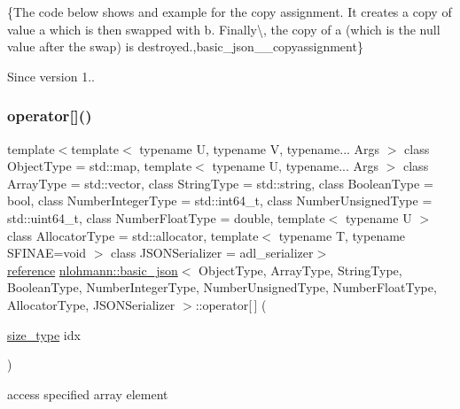 \{The code below shows and example for the copy assignment. It creates a copy of value {\ttfamily a} which is then swapped with {\ttfamily b}. Finally\textbackslash{}, the copy of {\ttfamily a} (which is the null value after the swap) is destroyed.,basic\+\_\+json\+\_\+\+\_\+copyassignment\}

\begin{DoxySince}{Since}
version 1.. 
\end{DoxySince}
\mbox{\label{classnlohmann_1_1basic__json_ac871e3b03fb2eeca9a8de4db2bea760f}} 
\subsubsection{\texorpdfstring{operator[]()}{operator[]()}\hspace{0.1cm}{\footnotesize\ttfamily [1/8]}}
{\footnotesize\ttfamily template$<$template$<$ typename U, typename V, typename... Args $>$ class Object\+Type = std\+::map, template$<$ typename U, typename... Args $>$ class Array\+Type = std\+::vector, class String\+Type  = std\+::string, class Boolean\+Type  = bool, class Number\+Integer\+Type  = std\+::int64\+\_\+t, class Number\+Unsigned\+Type  = std\+::uint64\+\_\+t, class Number\+Float\+Type  = double, template$<$ typename U $>$ class Allocator\+Type = std\+::allocator, template$<$ typename T, typename S\+F\+I\+N\+A\+E=void $>$ class J\+S\+O\+N\+Serializer = adl\+\_\+serializer$>$ \\
\mbox{\hyperlink{classnlohmann_1_1basic__json_ac6a5eddd156c776ac75ff54cfe54a5bc}{reference}} \mbox{\hyperlink{classnlohmann_1_1basic__json}{nlohmann\+::basic\+\_\+json}}$<$ Object\+Type, Array\+Type, String\+Type, Boolean\+Type, Number\+Integer\+Type, Number\+Unsigned\+Type, Number\+Float\+Type, Allocator\+Type, J\+S\+O\+N\+Serializer $>$\+::operator\mbox{[}$\,$\mbox{]} (\begin{DoxyParamCaption}\item[{\mbox{\hyperlink{classnlohmann_1_1basic__json_a39f2cd0b58106097e0e67bf185cc519b}{size\+\_\+type}}}]{idx }\end{DoxyParamCaption})\hspace{0.3cm}{\ttfamily [inline]}}



access specified array element 


